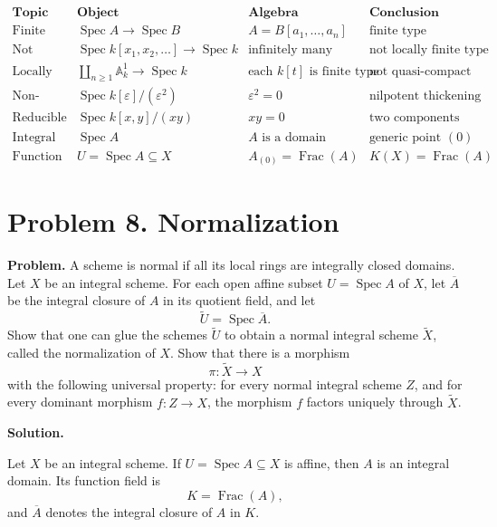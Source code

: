 \documentclass[12pt,a4paper]{article}
\theoremstyle{notespace}
\begin{document}
\[
\begin{array}{c|c|c|c}
	\textbf{Topic}
	&
	\textbf{Object}
	&
	\textbf{Algebra}
	&
	\textbf{Conclusion}
	\\
	\hline
	\text{Finite type}
	&
	\operatorname{Spec}A\to \operatorname{Spec}B
	&
	A=B[a_1,\dots,a_n]
	&
	\text{finite type}
	\\[5pt]
	\text{Not locally finite type}
	&
	\operatorname{Spec}k[x_1,x_2,\dots]\to \operatorname{Spec}k
	&
	\text{infinitely many generators}
	&
	\text{not locally finite type}
	\\[5pt]
	\text{Locally finite, not finite}
	&
	\displaystyle \coprod_{n\geq 1}\mathbb A_k^1\to \operatorname{Spec}k
	&
	\text{each }k[t]\text{ is finite type}
	&
	\text{not quasi-compact}
	\\[8pt]
	\text{Non-reduced}
	&
	\operatorname{Spec}k[\varepsilon]/(\varepsilon^2)
	&
	\varepsilon^2=0
	&
	\text{nilpotent thickening}
	\\[5pt]
	\text{Reducible}
	&
	\operatorname{Spec}k[x,y]/(xy)
	&
	xy=0
	&
	\text{two components}
	\\[5pt]
	\text{Integral}
	&
	\operatorname{Spec}A
	&
	A\text{ is a domain}
	&
	\text{generic point }(0)
	\\[5pt]
	\text{Function field}
	&
	U=\operatorname{Spec}A\subseteq X
	&
	A_{(0)}=\operatorname{Frac}(A)
	&
	K(X)=\operatorname{Frac}(A)
\end{array}
\]
\section{Problem 8. Normalization}

\textbf{Problem.}
A scheme is normal if all its local rings are integrally closed domains.
Let \(X\) be an integral scheme. For each open affine subset
\(U=\operatorname{Spec} A\) of \(X\), let \(\overline{A}\) be the integral
closure of \(A\) in its quotient field, and let
\[
\widetilde{U}=\operatorname{Spec}\overline{A}.
\]
Show that one can glue the schemes \(\widetilde{U}\) to obtain a normal
integral scheme \(\widetilde{X}\), called the normalization of \(X\).
Show that there is a morphism
\[
\pi:\widetilde{X}\longrightarrow X
\]
with the following universal property: for every normal integral scheme
\(Z\), and for every dominant morphism \(f:Z\to X\), the morphism \(f\)
factors uniquely through \(\widetilde{X}\).

\textbf{Solution.}

Let \(X\) be an integral scheme. If \(U=\operatorname{Spec}A\subseteq X\)
is affine, then \(A\) is an integral domain. Its function field is
\[
K=\operatorname{Frac}(A),
\]
and \(\overline{A}\) denotes the integral closure of \(A\) in \(K\).
\end{document}
